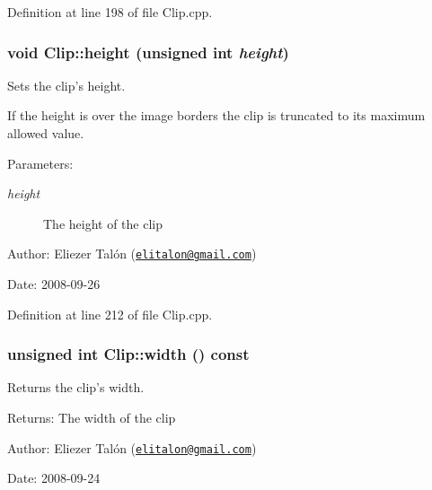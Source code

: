 Definition at line 198 of file Clip.cpp.\hypertarget{class_clip_c6eeb473cb104e6e3f90f4099c7ef741}{
\subsubsection[height]{\setlength{\rightskip}{0pt plus 5cm}void Clip::height (unsigned int {\em height})}}
\label{class_clip_c6eeb473cb104e6e3f90f4099c7ef741}


Sets the clip's height. 

If the height is over the image borders the clip is truncated to its maximum allowed value.

\begin{Desc}
\item[Parameters:]
\begin{description}
\item[{\em height}]The height of the clip\end{description}
\end{Desc}
\begin{Desc}
\item[Author:]Eliezer Talón (\href{mailto:elitalon@gmail.com}{\tt elitalon@gmail.com}) \end{Desc}
\begin{Desc}
\item[Date:]2008-09-26 \end{Desc}


Definition at line 212 of file Clip.cpp.\hypertarget{class_clip_d3e816599913e4051e5d50fae17ecd76}{
\subsubsection[width]{\setlength{\rightskip}{0pt plus 5cm}unsigned int Clip::width () const}}
\label{class_clip_d3e816599913e4051e5d50fae17ecd76}


Returns the clip's width. 

\begin{Desc}
\item[Returns:]The width of the clip\end{Desc}
\begin{Desc}
\item[Author:]Eliezer Talón (\href{mailto:elitalon@gmail.com}{\tt elitalon@gmail.com}) \end{Desc}
\begin{Desc}
\item[Date:]2008-09-24 \end{Desc}


